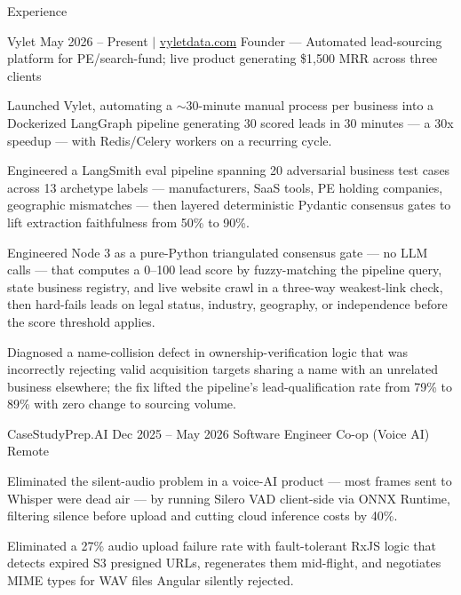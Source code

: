 \documentclass[
	11pt
]{../../../template}
\begin{document}
	\begin{rSection}{E}{xperience}
		\begin{rSectionEntry}
			{Vylet}
			{May 2026 -- Present $\vert$ \href{https://vyletdata.com}{vyletdata.com}}
			{Founder --- Automated lead-sourcing platform for PE/search-fund; live product generating \$1,500 MRR across three clients}
			{}
			{}

			\item Launched Vylet, automating a $\sim$30-minute manual process per business into a Dockerized LangGraph pipeline generating 30 scored leads in 30 minutes --- a 30x speedup --- with Redis/Celery workers on a recurring cycle.
			\item Engineered a LangSmith eval pipeline spanning 20 adversarial business test cases across 13 archetype labels --- manufacturers, SaaS tools, PE holding companies, geographic mismatches --- then layered deterministic Pydantic consensus gates to lift extraction faithfulness from 50\% to 90\%.
			\item Engineered Node 3 as a pure-Python triangulated consensus gate --- no LLM calls --- that computes a 0--100 lead score by fuzzy-matching the pipeline query, state business registry, and live website crawl in a three-way weakest-link check, then hard-fails leads on legal status, industry, geography, or independence before the score threshold applies.
			\item Diagnosed a name-collision defect in ownership-verification logic that was incorrectly rejecting valid acquisition targets sharing a name with an unrelated business elsewhere; the fix lifted the pipeline's lead-qualification rate from 79\% to 89\% with zero change to sourcing volume.
		\end{rSectionEntry}

		\begin{rSectionEntry}
			{CaseStudyPrep.AI}
			{Dec 2025 -- May 2026}
			{Software Engineer Co-op (Voice AI)}
			{}
			{Remote}

			\item Eliminated the silent-audio problem in a voice-AI product --- most frames sent to Whisper were dead air --- by running Silero VAD client-side via ONNX Runtime, filtering silence before upload and cutting cloud inference costs by 40\%.
			\item Eliminated a 27\% audio upload failure rate with fault-tolerant RxJS logic that detects expired S3 presigned URLs, regenerates them mid-flight, and negotiates MIME types for WAV files Angular silently rejected.
		\end{rSectionEntry}


\end{rSection}
\end{document}
